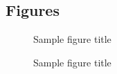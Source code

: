 \documentclass{bmcart}
\begin{document}
\begin{backmatter}






\section*{Figures}
\begin{figure}[h!]
  \caption{Sample figure title}
\end{figure}

\begin{figure}[h!]
  \caption{Sample figure title}
\end{figure}


\end{backmatter}
\end{document}
